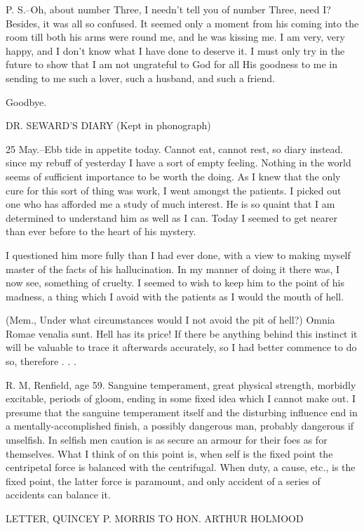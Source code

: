 P. S.--Oh, about number Three, I needn't tell you of number Three, need I? Besides, it was all so confused. It seemed only a moment from his coming into the room till both his arms were round me, and he was kissing me. I am very, very happy, and I don't know what I have done to deserve it. I must only try in the future to show that I am not ungrateful to God for all His goodness to me in sending to me such a lover, such a husband, and such a friend. 

Goodbye. 

DR. SEWARD'S DIARY (Kept in phonograph) 

25 May.--Ebb tide in appetite today. Cannot eat, cannot rest, so diary instead. since my rebuff of yesterday I have a sort of empty feeling. Nothing in the world seems of sufficient importance to be worth the doing. As I knew that the only cure for this sort of thing was work, I went amongst the patients. I picked out one who has afforded me a study of much interest. He is so quaint that I am determined to understand him as well as I can. Today I seemed to get nearer than ever before to the heart of his mystery. 

I questioned him more fully than I had ever done, with a view to making myself master of the facts of his hallucination. In my manner of doing it there was, I now see, something of cruelty. I seemed to wish to keep him to the point of his madness, a thing which I avoid with the patients as I would the mouth of hell. 

(Mem., Under what circumstances would I not avoid the pit of hell?) Omnia Romae venalia sunt. Hell has its price! If there be anything behind this instinct it will be valuable to trace it afterwards accurately, so I had better commence to do so, therefore . . . 

R. M, Renfield, age 59. Sanguine temperament, great physical strength, morbidly excitable, periods of gloom, ending in some fixed idea which I cannot make out. I presume that the sanguine temperament itself and the disturbing influence end in a mentally-accomplished finish, a possibly dangerous man, probably dangerous if unselfish. In selfish men caution is as secure an armour for their foes as for themselves. What I think of on this point is, when self is the fixed point the centripetal force is balanced with the centrifugal. When duty, a cause, etc., is the fixed point, the latter force is paramount, and only accident of a series of accidents can balance it. 

LETTER, QUINCEY P. MORRIS TO HON. ARTHUR HOLMOOD 

